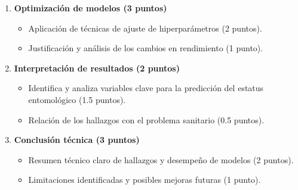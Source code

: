 \documentclass[a4,11pt]{aleph-notas}
\begin{document}
\begin{enumerate}[leftmargin=*,label=\textbf{\arabic*.}]
    \item \textbf{Optimización de modelos (3 puntos)}
    \begin{itemize}[leftmargin=*]
        \item Aplicación de técnicas de ajuste de hiperparámetros (2 puntos).
        \item Justificación y análisis de los cambios en rendimiento (1 punto).
    \end{itemize}

    \item \textbf{Interpretación de resultados (2 puntos)}
    \begin{itemize}[leftmargin=*]
        \item Identifica y analiza variables clave para la predicción del estatus entomológico (1.5 puntos).
        \item Relación de los hallazgos con el problema sanitario (0.5 puntos).
    \end{itemize}

    \item \textbf{Conclusión técnica (3 puntos)}
    \begin{itemize}[leftmargin=*]
        \item Resumen técnico claro de hallazgos y desempeño de modelos (2 puntos).
        \item Limitaciones identificadas y posibles mejoras futuras (1 punto).
    \end{itemize}
\end{enumerate}
\end{document}
